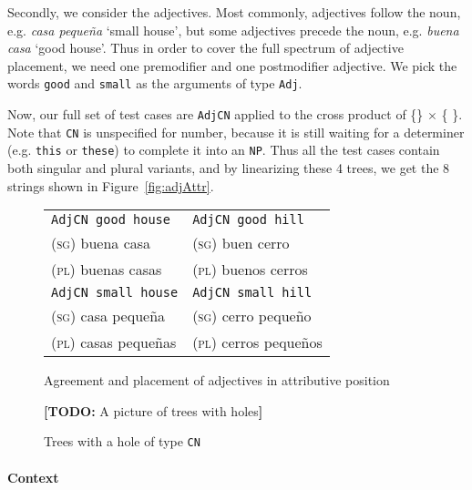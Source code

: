 \documentclass[11pt]{article}
\def\t#1{\texttt{#1}}
\newcommand{\todo}[1]{{\color{cyan}\textbf{[TODO: }#1\textbf{]}}}
\begin{document}
Secondly, we consider the adjectives. Most commonly, adjectives follow the noun, e.g. \emph{casa peque\~{n}a} `small house', 
but some adjectives precede the noun, e.g. \emph{buena casa} `good house'. Thus
in order to cover the full spectrum of adjective placement, we need one premodifier and one postmodifier adjective. We pick the words \t{good} and \t{small} as the arguments of type \t{Adj}.

Now, our full set of test cases are \t{AdjCN} applied to the cross product of \{\} $\times$ \{ \}. 
Note that \t{CN} is unspecified for number, because it is still waiting for a
determiner (e.g. \t{this} or \t{these}) to complete it into an
\t{NP}. Thus all the test cases contain both singular and plural
variants, and by linearizing these 4 trees, we get the 8 strings shown
in Figure~\ref{fig:adjAttr}.

\begin{figure}
\centering
\begin{minipage}{.5\textwidth}
\centering
\begin{tabular}{| l | l |}
\hline
\t{AdjCN good house}   & \t{AdjCN good hill} \\ 
\textsc{(sg)} buena casa             & \textsc{(sg)} buen cerro \\
\textsc{(pl)} buenas casas           & \textsc{(pl)} buenos cerros \\ \hline

\t{AdjCN small house}   & \t{AdjCN small hill} \\ 
\textsc{(sg)} casa  peque\~{n}a            & \textsc{(sg)} cerro  peque\~{n}o \\
\textsc{(pl)} casas  peque\~{n}as          & \textsc{(pl)} cerros  peque\~{n}os \\ \hline
\end{tabular}
\caption{Agreement and placement of adjectives in attributive position}
\label{fig:adjAttr}
\end{minipage}%
\begin{minipage}{.5\textwidth}
  \centering
  \todo{A picture of trees with holes}
 \caption{Trees with a hole of type \t{CN}}
\label{fig:treesWithHoles}
\end{minipage}
\end{figure}


\paragraph{Context} 
\end{document}
